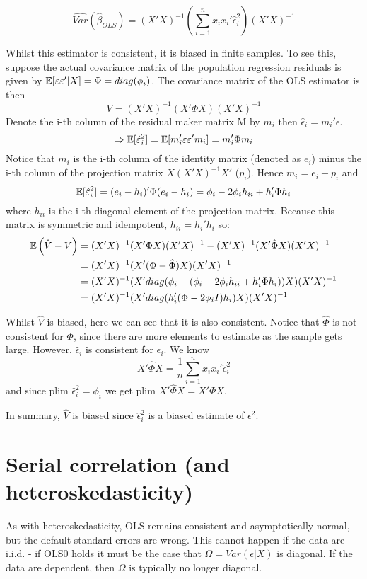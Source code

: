 \documentclass[DIV=14,titlepage=false]{scrreprt}
\begin{document}
\begin{definition}
    \[\widehat{Var}(\hat\beta_{OLS}) = (X'X)^{-1}\left(\sum_{i=1}^{n}x_ix_i'\hat \epsilon_i ^2 \right)(X'X)^{-1} \]
\end{definition}
\begin{note}
Whilst this estimator is consistent, it is biased in finite samples. To see this, suppose the actual covariance matrix of the population regression residuals is given by $\mathbb{E}[\varepsilon \varepsilon'|X] = \Phi = diag(\phi_i)$. The covariance matrix of the OLS estimator is then \[V=(X'X)^{-1}(X'\Phi X) (X'X)^{-1}\] Denote the i-th column of the residual maker matrix M by $m_i$ then $\hat \epsilon_i = m_i ' \epsilon$. 
\[ \Rightarrow \mathbb{E}[\hat {\varepsilon}_i^2] = \mathbb{E}[m_i' \varepsilon \varepsilon' m_i] = m_i'\Phi m_i \]
Notice that $m_i$ is the i-th column of the identity matrix (denoted as $e_i$) minus the i-th column of the projection matrix $X(X'X)^{-1}X'$ ($p_i$). Hence $m_i=e_i - p_i$ and 
\[ \mathbb{E}[\hat {\varepsilon}_i^2] = (e_i-h_i)'\Phi (e_i-h_i) = \phi_i - 2\phi_i h_{ii}+h_i'\Phi h_i \]
where $h_{ii}$ is the i-th diagonal element of the projection matrix. Because this matrix is symmetric and idempotent, $h_{ii} = h_i'h_i$ so: 
\begin{align*}
    \mathbb{E}\left(\hat V - V\right) &= (X'X)^{-1}(X'\Phi X) (X'X)^{-1} - (X'X)^{-1}(X' \hat \Phi X) (X'X)^{-1}\\
    &= (X'X)^{-1}(X'(\Phi-\hat \Phi) X) (X'X)^{-1}\\
    &= (X'X)^{-1}(X' diag(\phi_i - (\phi_i - 2\phi_i h_{ii}+h_i'\Phi h_i) ) X) (X'X)^{-1}\\
    &= (X'X)^{-1}(X'diag(h_i'(\Phi - 2\phi_iI)h_i)X) (X'X)^{-1}
\end{align*}


Whilst $\hat V$ is biased, here we can see that it is also consistent. Notice that $ \hat \Phi $ is not consistent for $\Phi$, since there are more elements to estimate as the sample gets large. However, $\hat \epsilon_i$ is consistent for $\epsilon_i$. We know \[X'\hat \Phi X = \frac{1}{n}\sum_{i=1}^{n}  x_ix_i'\hat \epsilon_i^2 \] and since plim $\hat \epsilon_i ^2 = \phi_i$ we get plim $X'\hat \Phi X = X' \Phi X$.

In summary, $\hat V$ is biased since $\hat\epsilon^2_i$ is a biased estimate of $\epsilon^2$.
\end{note}

\section{Serial correlation (and heteroskedasticity)}
As with heteroskedasticity, OLS remains consistent and asymptotically normal, but the default standard errors are wrong. This cannot happen if the data are i.i.d. - if OLS0 holds it must be the case that $\Omega = Var(\epsilon|X)$ is diagonal. If the data are dependent, then $\Omega$ is typically no longer diagonal.
\end{document}
